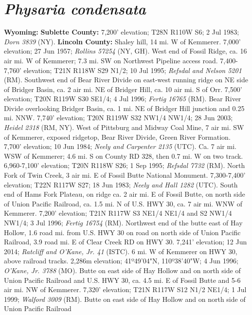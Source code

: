 \section*{\textit{Physaria condensata}}

  \textbf{Wyoming:}
  \textbf{Sublette County:}
7,200' elevation; T28N R110W S6; 2 Jul 1983; \textit{Dorn 3839} (NY).
  \textbf{Lincoln County:}
Shaley hill, 14 mi. W of Kemmerer. 7,000' elevation; 27 Jun 1957;
\textit{Rollins 57254} (NY, GH).
West end of Fossil Ridge, ca. 16 air mi. W of Kemmerer; 7.3 mi. SW on Northwest
Pipeline access road. 7,400-7,760' elevation; T21N R118W S29 N1/2; 10 Jul 1995;
\textit{Refsdal and Nelson 5201} (RM).
Southwest end of Bear River Divide on east-west running ridge on NE side of
Bridger Basin, ca. 2 air mi. NE of Bridger Hill, ca. 10 air mi. S of Orr.
7,500' elevation; T20N R119W S30 SE1/4; 4 Jul 1996; \textit{Fertig 16765} (RM).
Bear River Divide overlooking Bridger Basin, ca. 1 mi. NE of Bridger Hill
junction and 0.25 mi. NNW. 7,740' elevation; T20N R119W S32 NW1/4 NW1/4;
28 Jun 2003; \textit{Heidel 2318} (RM, NY).
West of Pittsburg and Midway Coal Mine, 7 air mi. SW of Kemmerer, exposed
ridgetop, Bear River Divide, Green River Formation. 7,700' elevation;
10 Jun 1984; \textit{Neely and Carpenter 2135} (UTC).
Ca. 7 air mi. WSW of Kemmerer; 4.6 mi. S on County RD 328, then 0.7 mi. W on
two track. 6,960-7,100' elevation; T20N R118W S26; 1 Sep 1995;
\textit{Refsdal 7732} (RM).
North Fork of Twin Creek, 3 air mi. E of Fossil Butte National Monument.
7,300-7,400' elevation; T22N R117W S27; 18 Jun 1983;
\textit{Neely and Hall 1282} (UTC).
South end of Hams Fork Plateau, on ridge ca. 2 air mi. E of Fossil Butte,
on north side of Union Pacific Railroad, ca. 1.5 mi. N of U.S. HWY 30, ca. 7
air mi. WNW of Kemmerer. 7,200' elevation; T21N R117W S3 NE1/4 NE1/4 and S2
NW1/4 NW1/4; 3 Jul 1996; \textit{Fertig 16754} (RM).
Northwest end of the butte east of Hay Hollow, 1.6 road mi. from U.S. HWY 30 on
road on north side of Union Pacific Railroad, 3.9 road mi. E of Clear Creek RD
on HWY 30. 7,241' elevation; 12 Jun 2014;
\textit{Ratcliff and O'Kane, Jr. 41} (ISTC).
6 mi. W of Kemmerer on HWY 30, above railroad tracks. 2,286m elevation;
41º49'04"N, 110º38'40"W; 4 Jun 1996; \textit{O'Kane, Jr. 3788} (MO).
Butte on east side of Hay Hollow and on north side of Union Pacific Railroad
and U.S. HWY 30, ca. 4.5 mi. E of Fossil Butte and 5-6 air mi. NW of Kemmerer.
7,320' elevation; T21N R117W S12 N1/2 NE1/4; 1 Jul 1999;
\textit{Walford 3009} (RM).
Butte on east side of Hay Hollow and on north side of Union Pacific Railroad
